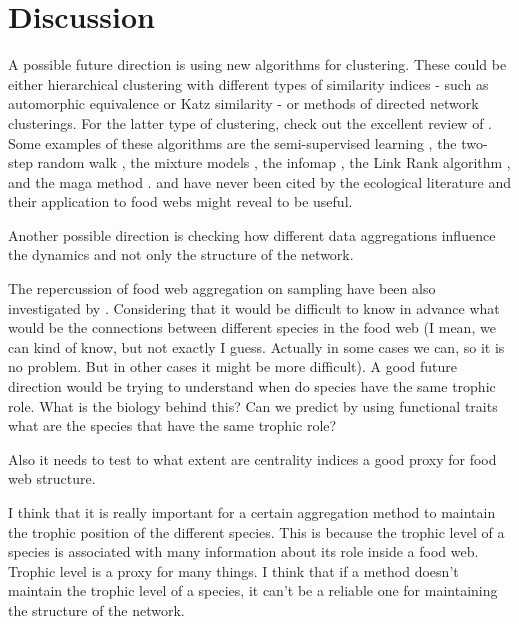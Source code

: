 \documentclass[twocolumn]{article}
\begin{document}
\section*{Discussion}
	A possible future direction is using new algorithms for clustering.
	These could be either hierarchical clustering with different types of similarity indices - such as automorphic equivalence \citep{Wasserman1994} or Katz similarity \citep{Newman2018} - or methods of directed network clusterings.
	For the latter type of clustering, check out the excellent review of \citet{Malliaros2013}.
	Some examples of these algorithms are the semi-supervised learning \citep{Zhou2005}, the two-step random walk \citep{Huang2006}, the mixture models \citep{Newman2007,Ramasco2008,Wang2008}, the infomap \citep{Rosvall2008}, the Link Rank algorithm \citep{Kim2010}, and the maga method \citep{Zhan2011}.
	\citet{Zhou2005,Huang2006,Wang2008,Kim2010} and \citet{Zhan2011} have never been cited by the ecological literature and their application to food webs might reveal to be useful.
	\par
	Another possible direction is checking how different data aggregations influence the dynamics and not only the structure of the network.
	\par
	The repercussion of food web aggregation on sampling have been also investigated by \citet{Patonai2017}.
	Considering that it would be difficult to know in advance what would be the connections between different species in the food web (I mean, we can kind of know, but not exactly I guess.
	Actually in some cases we can, so it is no problem.
	But in other cases it might be more difficult).
	A good future direction would be trying to understand when do species have the same trophic role.
	What is the biology behind this?
	Can we predict by using functional traits what are the species that have the same trophic role?
	\par
	Also it needs to test to what extent are centrality indices a good proxy for food web structure.
	\par
	I think that it is really important for a certain aggregation method to maintain the trophic position of the different species.
	This is because the trophic level of a species is associated with many information about its role inside a food web.
	Trophic level is a proxy for many things.
	I think that if a method doesn't maintain the trophic level of a species, it can't be a reliable one for maintaining the structure of the network.
	\par
\end{document}
